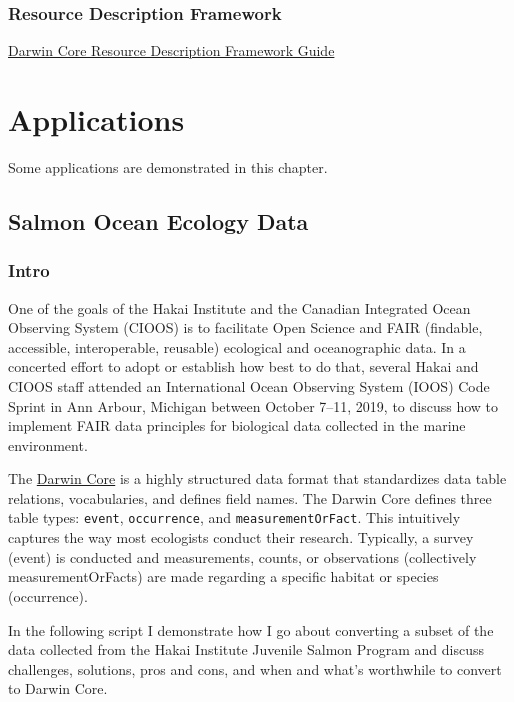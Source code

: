 \documentclass[
]{book}
\begin{document}
\hypertarget{resource-description-framework}{%
\subsection{Resource Description Framework}\label{resource-description-framework}}

\href{https://dwc.tdwg.org/rdf/}{Darwin Core Resource Description Framework Guide}

\hypertarget{applications}{%
\chapter{Applications}\label{applications}}

Some applications are demonstrated in this chapter.

\hypertarget{salmon-ocean-ecology-data}{%
\section{Salmon Ocean Ecology Data}\label{salmon-ocean-ecology-data}}

\hypertarget{intro-1}{%
\subsection{Intro}\label{intro-1}}

One of the goals of the Hakai Institute and the Canadian Integrated Ocean Observing System (CIOOS) is to facilitate Open Science and FAIR (findable, accessible, interoperable, reusable) ecological and oceanographic data. In a concerted effort to adopt or establish how best to do that, several Hakai and CIOOS staff attended an International Ocean Observing System (IOOS) Code Sprint in Ann Arbour, Michigan between October 7--11, 2019, to discuss how to implement FAIR data principles for biological data collected in the marine environment.

The \href{https://dwc.tdwg.org}{Darwin Core} is a highly structured data format that standardizes data table relations, vocabularies, and defines field names. The Darwin Core defines three table types: \texttt{event}, \texttt{occurrence}, and \texttt{measurementOrFact}. This intuitively captures the way most ecologists conduct their research. Typically, a survey (event) is conducted and measurements, counts, or observations (collectively measurementOrFacts) are made regarding a specific habitat or species (occurrence).

In the following script I demonstrate how I go about converting a subset of the data collected from the Hakai Institute Juvenile Salmon Program and discuss challenges, solutions, pros and cons, and when and what's worthwhile to convert to Darwin Core.
\end{document}
